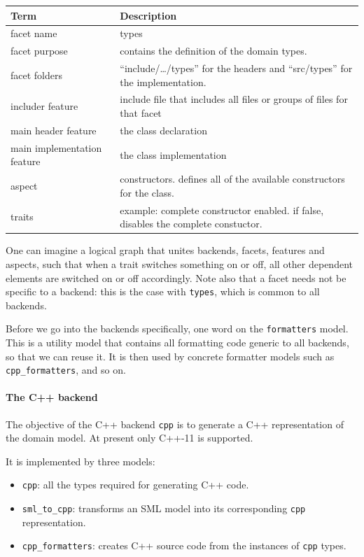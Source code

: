 \documentclass{book}
\begin{document}
\begin{center}
\begin{tabular}{ll}
Term & Description\\
\hline
facet name & types\\
facet purpose & contains the definition of the domain types.\\
facet folders & ``include/\ldots{}/types'' for the headers and ``src/types'' for the implementation.\\
includer feature & include file that includes all files or groups of files for that facet\\
main header feature & the class declaration\\
main implementation feature & the class implementation\\
aspect & constructors. defines all of the available constructors for the class.\\
traits & example: complete constructor enabled. if false, disables the complete constuctor.\\
\end{tabular}
\end{center}

One can imagine a logical graph that unites backends, facets, features
and aspects, such that when a trait switches something on or off, all
other dependent elements are switched on or off accordingly. Note also
that a facet needs not be specific to a backend: this is the case with
\texttt{types}, which is common to all backends.

Before we go into the backends specifically, one word on the
\texttt{formatters} model. This is a utility model that contains all
formatting code generic to all backends, so that we can reuse it. It
is then used by concrete formatter models such as
\texttt{cpp\_formatters}, and so on.

\paragraph{The C++ backend}

The objective of the C++ backend \texttt{cpp} is to generate a C++
representation of the domain model. At present only C++-11 is
supported.

It is implemented by three models:

\begin{itemize}
\item \texttt{cpp}: all the types required for generating C++ code.
\item \texttt{sml\_to\_cpp}: transforms an SML model into its
  corresponding \texttt{cpp} representation.
\item \texttt{cpp\_formatters}: creates C++ source code from the
  instances of \texttt{cpp} types.
\end{itemize}
\end{document}
